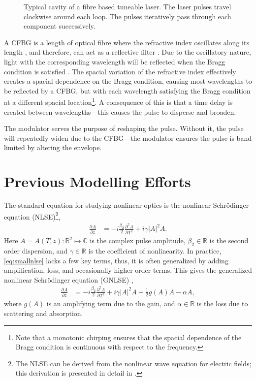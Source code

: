 \documentclass[graybox]{svmult}
\newcommand{\pdiff}[3][]{\frac{\partial^{#1}#2}{\partial{#3}^{#1}}}
\begin{document}
\begin{figure}[tbp]
	\centering
	
	\caption{Typical cavity of a fibre based tuneable laser. The laser pulses travel clockwise around each loop. The pulses iteratively pass through each component successively.}
	\label{fig:cavity}
\end{figure}
A CFBG is a length of optical fibre where the refractive index oscillates along its length \cite{ferreira}, and therefore, can act as a reflective filter \cite{agrawal2002, alazzawi, ferreira, starodoumov}. Due to the oscillatory nature, light with the corresponding wavelength will be reflected when the Bragg condition is satisfied \cite{agrawal2002, alazzawi, becker, ferreira, silfvast, starodoumov}. The spacial variation of the refractive index effectively creates a spacial dependence on the Bragg condition, causing most wavelengths to be reflected by a CFBG, but with each wavelength satisfying the Bragg condition at a different spacial location\footnote{Note that a monotonic chirping ensures that the spacial dependence of the Bragg condition is continuous with respect to the frequency.}. A consequence of this is that a time delay is created between wavelengths---this causes the pulse to disperse and broaden.

The modulator serves the purpose of reshaping the pulse. Without it, the pulse will repeatedly widen due to the CFBG---the modulator ensures the pulse is band limited by altering the envelope. 

\section{Previous Modelling Efforts}
\label{sec:modelling}
The standard equation for studying nonlinear optics is the nonlinear Schr\"odinger equation (NLSE)\footnote{The NLSE can be derived from the nonlinear wave equation for electric fields; this derivation is presented in detail in \cite{agrawal2013, ferreira}.},
\begin{align}
	\pdiff{A}{z} &= - i \frac{\beta_2}{2}\pdiff[2]{A}{T} + i \gamma |A|^2 A.
	\label{eq:smallnlse}
\end{align}
Here $A = A(T, z) : \mathbb{R}^2 \mapsto \mathbb{C}$ is the complex pulse amplitude, $\beta_2 \in \mathbb{R}$ is the second order dispersion, and $\gamma \in \mathbb{R}$ is the coefficient of nonlinearity. In practice, \eqref{eq:smallnlse} lacks a few key terms, thus, it is often generalized by adding amplification, loss, and occasionally higher order terms. This gives the generalized nonlinear Schr\"{o}dinger equation (GNLSE) \cite{agrawal2013, bohun, finot, peng, shtyrina, yarutkina},
\begin{align}
	\label{eq:nlse}
	\pdiff{A}{z} &= - i \frac{\beta_2}{2}\pdiff[2]{A}{T} + i \gamma |A|^2 A + \frac{1}{2}g(A) A - \alpha A,
\end{align}
where $g(A)$ is an amplifying term due to the gain, and $\alpha \in \mathbb{R}$ is the loss due to scattering and absorption.
\end{document}
